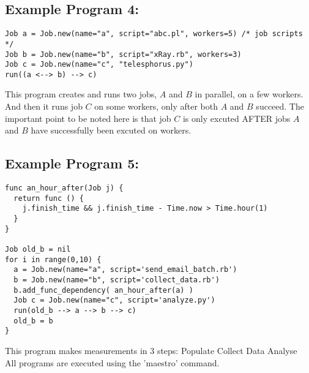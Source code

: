 \subsection*{Example Program 4:}
\begin{lstlisting}
Job a = Job.new(name="a", script="abc.pl", workers=5) /* job scripts */
Job b = Job.new(name="b", script="xRay.rb", workers=3)
Job c = Job.new(name="c", "telesphorus.py")
run((a <--> b) --> c)
\end{lstlisting}

This program creates and runs two jobs, $A$ and $B$ in parallel, on a few
workers. And then it runs job $C$ on some workers, only after both $A$
and $B$ succeed. The important point to be noted here is that job $C$ is 
only excuted AFTER jobs $A$ and $B$ have successfully been excuted on workers.
\\

\subsection*{Example Program 5:}
\begin{lstlisting}
func an_hour_after(Job j) {
  return func () {
    j.finish_time && j.finish_time - Time.now > Time.hour(1)
  }
}

Job old_b = nil
for i in range(0,10) {
  a = Job.new(name="a", script='send_email_batch.rb')
  b = Job.new(name="b", script='collect_data.rb')
  b.add_func_dependency( an_hour_after(a) )
  Job c = Job.new(name="c", script='analyze.py')
  run(old_b --> a --> b --> c)
  old_b = b
}
\end{lstlisting}
This program makes measurements in 3 steps:
Populate
Collect Data
Analyse
\\

All programs are executed using the 'maestro' command.
\\
